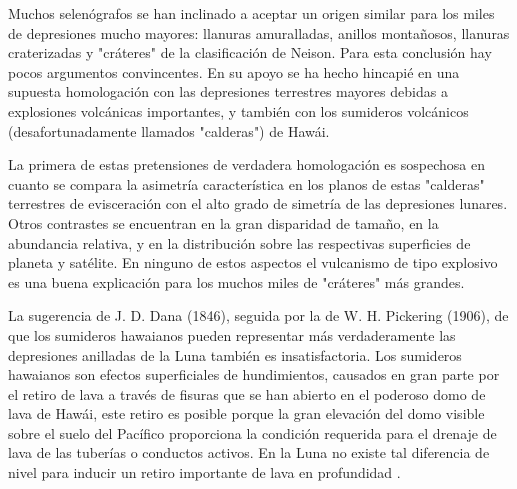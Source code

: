 \documentclass[12pt]{article}
\begin{document}
Muchos selenógrafos se han inclinado a 
aceptar un origen similar para los miles de 
depresiones mucho mayores: llanuras amuralladas, anillos montañosos, 
llanuras craterizadas y "cráteres" de la clasificación de Neison. 
Para esta conclusión hay pocos argumentos 
convincentes. En su apoyo se ha hecho hincapié 
en una supuesta homologación con las 
depresiones terrestres mayores debidas a explosiones volcánicas importantes, 
y también con los sumideros volcánicos 
(desafortunadamente llamados "calderas") de 
Hawái. 

La primera de estas pretensiones de verdadera homologación es 
sospechosa en cuanto se compara la 
asimetría característica en los planos de estas "calderas" 
terrestres de evisceración con el alto grado de simetría de las depresiones 
lunares. Otros contrastes se encuentran en la gran 
disparidad de tamaño, en la abundancia relativa, y en la 
distribución sobre las respectivas superficies de 
planeta y satélite. En ninguno de estos aspectos 
el vulcanismo de tipo explosivo es una buena 
explicación para los muchos miles de "cráteres" más grandes. 

La sugerencia de J. D. Dana (1846), seguida 
por la de W. H. Pickering (1906), de que 
los sumideros hawaianos pueden representar más verdaderamente las 
depresiones anilladas de la Luna también es 
insatisfactoria. Los sumideros hawaianos son efectos superficiales 
de hundimientos, causados en gran parte por el 
retiro de lava a través de fisuras que se han 
abierto en el poderoso domo de lava de Hawái, este 
retiro es posible porque la gran 
elevación del domo visible sobre el 
suelo del Pacífico proporciona la condición requerida para el 
drenaje de lava de las tuberías o 
conductos activos. En la Luna no existe tal diferencia 
de nivel para inducir un retiro importante de lava 
en profundidad \parencite{Reginaldb}.
\end{document}
